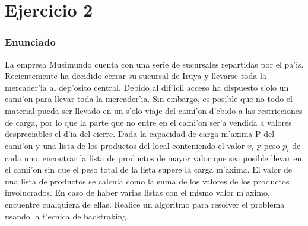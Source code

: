 \part{Ejercicio 2}
\section{Enunciado}
La empresa Musimundo cuenta con una serie de sucursales repartidas por el pa'is. Recientemente ha decidido cerrar su sucursal
de Iruya y llevarse toda la mercader'ia al dep'osito central. Debido al dif'icil acceso ha dispuesto s'olo un cami'on para
llevar toda la mercader'ia. Sin embargo, es posible que no todo el material pueda ser llevado en un s'olo viaje del cami'on
d'ebido a las restricciones de carga, por lo que la parte que no entre en el cami'on ser'a vendida a valores despreciables el
 d'ia del cierre.
Dada la capacidad de carga m'axima P del cami'on y una lista de los productos del local conteniendo el valor $v_i$ y peso $p_i$ 
de cada uno, encontrar la lista de productos de mayor valor que sea posible llevar en el cami'on sin que el peso total de la
lista supere la carga m'axima. El valor de una lista de productos se calcula como la suma de los valores de los productos
involucrados. En caso de haber varias listas con el mismo valor m'aximo, encuentre cualquiera de ellas.
Realice un algoritmo para resolver el problema usando la t'ecnica de backtraking.

